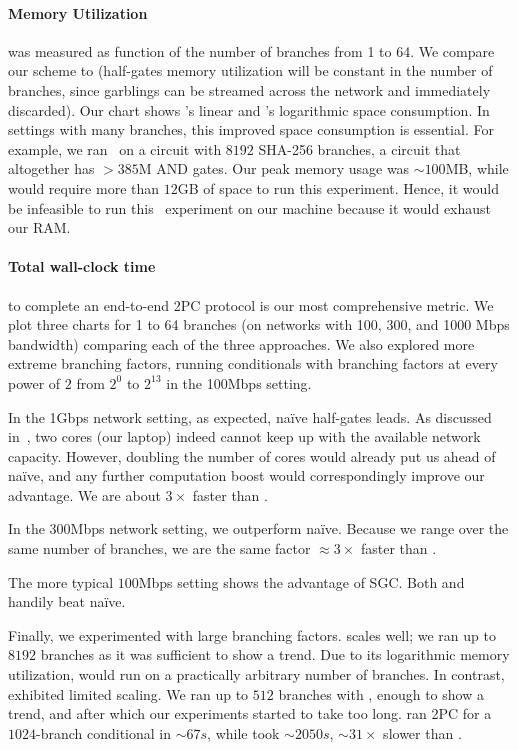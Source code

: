 \paragraph{Memory Utilization} was measured as function of the number
of branches from 1 to 64.
We compare our scheme to \stack (half-gates memory utilization will be
constant in the number of branches, since garblings
can be streamed across the network and immediately discarded).
%
Our chart shows \stack's linear and
\ourschemelong's logarithmic space consumption.
In settings with many branches, this improved space consumption
is essential.
For example, we ran \ourschemelong\ on a circuit
with $8192$ SHA-256 branches, a circuit that altogether has $> 385$M
AND gates.  Our peak memory usage was $\sim 100$MB, while \HK
would require more than $12$GB of space to run this experiment.
Hence, it would be
infeasible to run this \stack\ experiment on our machine because it
would exhaust our RAM.

\paragraph{Total wall-clock time} to complete an end-to-end 2PC
protocol is our most comprehensive metric.
We plot three charts for 1 to 64
branches (on networks with 100, 300, and 1000 Mbps bandwidth) comparing each of the three approaches.
We also explored more extreme branching factors, running conditionals with
branching factors at every power of $2$ from $2^0$ to $2^{13}$ in the 100Mbps setting.

In the 1Gbps network setting, as expected, na\"ive half-gates leads.
As discussed in~, two cores (our laptop) indeed
cannot keep up with the available network capacity.  However, doubling
the number of cores would already put us ahead of na\"ive, and any
further computation boost would correspondingly improve
our advantage.  We are about $3\times$ faster than \stack.

In the 300Mbps network setting, we outperform na\"ive.  Because we
range over the same number of branches, we are the same
factor $\approx 3\times$ faster than \stack.

The more typical $100$Mbps setting shows the advantage of SGC.
Both \stack and \ourschemelong handily beat na\"ive.

Finally, we experimented with large branching factors.
\ourschemelong scales well; we ran up to $8192$ branches as it
was sufficient to show a trend.  Due to its logarithmic memory
utilization, \ourschemelong would run on a practically
arbitrary number of branches.  In contrast, \stack exhibited limited scaling.  We ran up to $512$ branches with
\stack, enough to show a trend, and after which our experiments
started to take too long.   \ourschemelong ran 2PC for a
$1024$-branch conditional in $\sim 67s$, while \stack took $\sim
2050s$,  $\sim 31\times$ slower than \ourschemelong.


